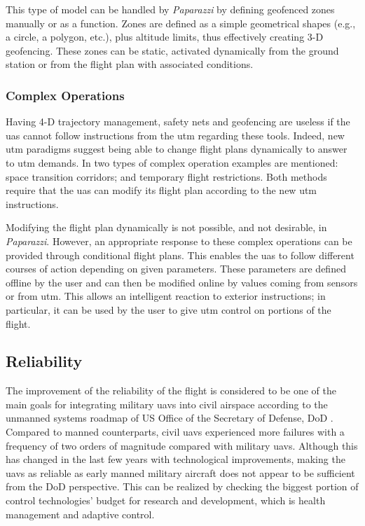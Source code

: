 		This type of model can be handled by \emph{Paparazzi} by defining geofenced zones manually or as a function. Zones are defined as a simple geometrical shapes (e.g., a circle, a polygon, etc.), plus altitude limits, thus effectively creating 3-D geofencing. 
		These zones can be static, activated dynamically from the ground station or from the flight plan with associated conditions.
	
	\subsubsection{Complex Operations}
		Having 4-D trajectory management, safety nets and geofencing are useless if the \gls{uas} cannot follow instructions from the \gls{utm} regarding these tools.
		Indeed, new \gls{utm} paradigms suggest being able to change flight plans dynamically to answer to \gls{utm} demands. In \cite{wargo_complex_2015} two types of complex operation examples are mentioned: space transition corridors; and temporary flight restrictions.
		Both methods require that the \gls{uas} can modify its flight plan according to the new \gls{utm} instructions.
		
		Modifying the flight plan dynamically is not possible, and not desirable, in \emph{Paparazzi}. 
		However, an appropriate response to these complex operations can be provided through conditional flight plans. 
		This enables the \gls{uas} to follow different courses of action depending on given parameters. 
		These parameters are defined offline by the user and can then be modified online by values coming from sensors or from \gls{utm}. 
		This allows an intelligent reaction to exterior instructions; in particular, it can be used by the user to give \gls{utm} control on portions of the flight.
		
\subsection{Reliability}

The improvement of the reliability of the flight is considered to be one of the main goals for integrating military \gls{uav}s into civil airspace according to the unmanned systems roadmap of US Office of the Secretary of Defense, DoD \cite{UnmannedSystemsRoadmapDoD}. Compared to manned counterparts, civil \gls{uav}s experienced more failures with a frequency of two orders of magnitude compared with military \gls{uav}s.  Although this has changed in the last few years with technological improvements, making the \gls{uav}s as reliable as early manned military aircraft does not appear to be sufficient from the DoD perspective. This can be realized by checking the biggest portion of control technologies' budget for research and development, which is health management and adaptive control.

